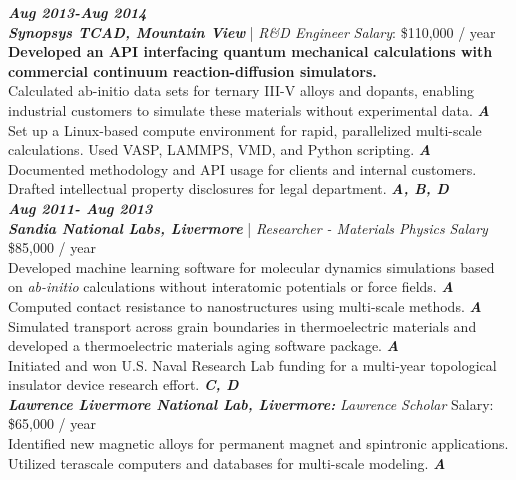 \documentclass[11pt, a4paper]{article}
\newcommand{\years}[1]{\marginnote{\scriptsize #1}}
\begin{document}
\textit{\textbf{Aug 2013-Aug 2014}}\\\textbf{\emph{Synopsys TCAD, Mountain View}} |  \emph{R\&D Engineer} \newline
\textit{Salary}: \$110,000 / year \\
 \textbf{{\color{mycolor2}Developed an API interfacing quantum mechanical calculations with commercial continuum reaction-diffusion simulators.}} \\ \textbullet Calculated ab-initio data sets for ternary III-V alloys and dopants, enabling industrial customers to simulate these materials without experimental data. \textit{\textbf{{\color{mycolor1}A}}} \\ \textbullet Set up a Linux-based compute environment for rapid, parallelized multi-scale calculations. Used VASP, LAMMPS, VMD, and Python scripting. \textit{\textbf{{\color{mycolor1}A}}}\\
 \textbullet Documented methodology and API usage for clients and internal customers. Drafted intellectual property disclosures for legal department. \textit{\textbf{{\color{mycolor1}A, B, D}}} \\

\noindent
\textit{\textbf{Aug 2011- Aug 2013}}\\
\textbf{\emph{Sandia National Labs, Livermore}} | \emph{Researcher - Materials Physics} \newline
\textit{Salary} \$85,000 / year \\
\textbullet Developed machine learning software for molecular dynamics simulations based on \textit{ab-initio} calculations without interatomic potentials or force fields. \textit{\textbf{{\color{mycolor1}A}}}\\
\textbullet Computed contact resistance to nanostructures using multi-scale methods. \textit{\textbf{{\color{mycolor1}A}}}\\
\textbullet Simulated transport across grain boundaries in thermoelectric materials and developed a thermoelectric materials aging software package. \textit{\textbf{{\color{mycolor1}A}}}\\
\textbullet Initiated and won U.S. Naval Research Lab funding for a multi-year topological insulator device research effort. \textit{\textbf{{\color{mycolor1}C, D}}}\\

\years{2009-2011}\textbf{\emph{Lawrence Livermore National Lab, Livermore:}}
\emph{Lawrence Scholar}\newline
Salary: \$65,000 / year \\
Identified new magnetic alloys for permanent magnet and spintronic applications. Utilized terascale computers and databases for multi-scale modeling. \textit{\textbf{{\color{mycolor1}A}}} \\
\end{document}
